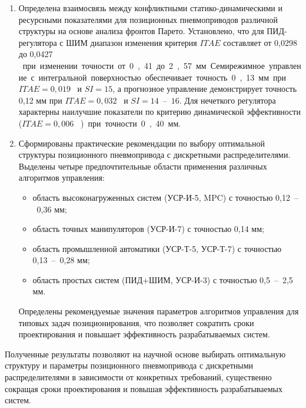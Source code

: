 \begin{enumerate}
	\item Определена взаимосвязь между конфликтными статико-динамическими и ресурсными показателями
	      для позиционных пневмоприводов различной структуры на основе анализа фронтов Парето. Установлено,
	      что для ПИД-регулятора с ШИМ диапазон изменения критерия $ITAE$ составляет от 0,0298 до 0,0427 \si{\meter\per\second\square}
	      при изменении точности от 0,41 до 2,57 мм. Семирежимное управление с интегральной поверхностью
	      обеспечивает точность 0,13 мм при $ITAE = 0,019$ \si{\meter\per\second\square} и $SI = 15$, а прогнозное управление демонстрирует
	      точность 0,12 мм при $ITAE = 0,032$ \si{\meter\per\second\square} и $SI = 14$~--~$16$. Для нечеткого регулятора характерны
	      наилучшие показатели по критерию динамической эффективности ($ITAE = 0,006$ \si{\meter\per\second\square}) при точности 0,40 мм.

	\item Сформированы практические рекомендации по выбору оптимальной структуры позиционного
	      пневмопривода с дискретными распределителями. Выделены четыре предпочтительные области
	      применения различных алгоритмов управления:
	      \begin{itemize}
		      \item область высоконагруженных систем (УСР-И-5, MPC) с точностью 0,12~--~0,36 мм;
		      \item область точных манипуляторов (УСР-И-7) с точностью 0,14 мм;
		      \item область промышленной автоматики (УСР-Т-5, УСР-Т-7) с точностью 0,13~--~0,28 мм;
		      \item область простых систем (ПИД+ШИМ, УСР-И-3) с точностью 0,5~--~2,5 мм.
	      \end{itemize}
	      Определены рекомендуемые значения параметров алгоритмов управления для типовых задач
	      позиционирования, что позволяет сократить сроки проектирования и повышает эффективность разрабатываемых систем.
\end{enumerate}

Полученные результаты позволяют на научной основе выбирать оптимальную структуру и
параметры позиционного пневмопривода с дискретными распределителями в зависимости
от конкретных требований, существенно сокращая сроки проектирования и повышая
эффективность разрабатываемых систем.

% 


